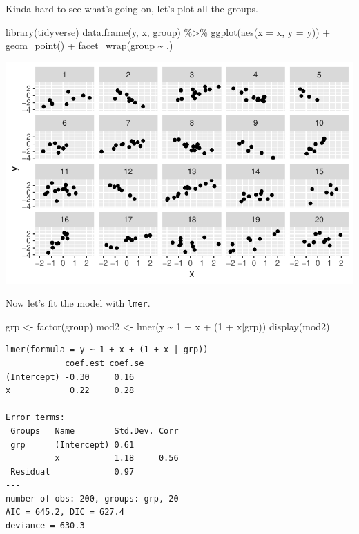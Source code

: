 \documentclass[
  letterpaper,
  DIV=11,
  numbers=noendperiod]{scrartcl}
\newenvironment{Shaded}{\begin{snugshade}}{\end{snugshade}}
\newcommand{\AttributeTok}[1]{\textcolor[rgb]{0.40,0.45,0.13}{#1}}
\newcommand{\DecValTok}[1]{\textcolor[rgb]{0.68,0.00,0.00}{#1}}
\newcommand{\FunctionTok}[1]{\textcolor[rgb]{0.28,0.35,0.67}{#1}}
\newcommand{\NormalTok}[1]{\textcolor[rgb]{0.00,0.23,0.31}{#1}}
\newcommand{\OtherTok}[1]{\textcolor[rgb]{0.00,0.23,0.31}{#1}}
\newcommand{\SpecialCharTok}[1]{\textcolor[rgb]{0.37,0.37,0.37}{#1}}
\begin{document}
Kinda hard to see what's going on, let's plot all the groups.

\begin{Shaded}
\begin{Highlighting}[]
\FunctionTok{library}\NormalTok{(tidyverse)}
\FunctionTok{data.frame}\NormalTok{(y, x, group) }\SpecialCharTok{\%\textgreater{}\%} 
  \FunctionTok{ggplot}\NormalTok{(}\FunctionTok{aes}\NormalTok{(}\AttributeTok{x =}\NormalTok{ x, }\AttributeTok{y =}\NormalTok{ y)) }\SpecialCharTok{+}
  \FunctionTok{geom\_point}\NormalTok{() }\SpecialCharTok{+}
  \FunctionTok{facet\_wrap}\NormalTok{(group }\SpecialCharTok{\textasciitilde{}}\NormalTok{ .)}
\end{Highlighting}
\end{Shaded}

\includegraphics{varying_intercepts_varying_slopes_files/figure-pdf/unnamed-chunk-5-1.pdf}

Now let's fit the model with \texttt{lmer}.

\begin{Shaded}
\begin{Highlighting}[]
\NormalTok{grp }\OtherTok{\textless{}{-}} \FunctionTok{factor}\NormalTok{(group)}
\NormalTok{mod2 }\OtherTok{\textless{}{-}} \FunctionTok{lmer}\NormalTok{(y }\SpecialCharTok{\textasciitilde{}} \DecValTok{1} \SpecialCharTok{+}\NormalTok{ x }\SpecialCharTok{+}\NormalTok{ (}\DecValTok{1} \SpecialCharTok{+}\NormalTok{ x}\SpecialCharTok{|}\NormalTok{grp))}
\FunctionTok{display}\NormalTok{(mod2)}
\end{Highlighting}
\end{Shaded}

\begin{verbatim}
lmer(formula = y ~ 1 + x + (1 + x | grp))
            coef.est coef.se
(Intercept) -0.30     0.16  
x            0.22     0.28  

Error terms:
 Groups   Name        Std.Dev. Corr 
 grp      (Intercept) 0.61          
          x           1.18     0.56 
 Residual             0.97          
---
number of obs: 200, groups: grp, 20
AIC = 645.2, DIC = 627.4
deviance = 630.3 
\end{verbatim}
\end{document}
